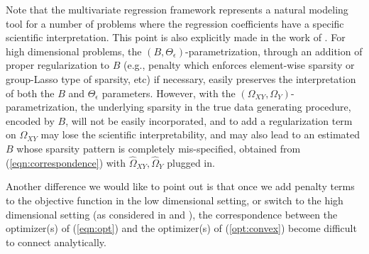 Note that the multivariate regression framework represents a natural modeling tool for a number of problems where the regression coefficients have a specific scientific interpretation. This point is also explicitly made in the work of \citet{andersson2001alternative}.  For high dimensional problems, the $(B,\Theta_\epsilon)$-parametrization, through an addition of  
proper regularization to $B$ (e.g., penalty which enforces element-wise sparsity or group-Lasso type of sparsity, etc) if necessary,
easily preserves the interpretation of both the $B$ and $\Theta_\epsilon$ parameters.
However, with the $(\Omega_{XY},\Omega_Y)$-parametrization, the underlying sparsity in the true data generating procedure, encoded by $B$, will not be easily incorporated, and to add a regularization term on $\Omega_{XY}$ may lose the scientific interpretability, and may also lead to an estimated $B$ whose sparsity pattern is completely mis-specified, obtained from (\ref{eqn:correspondence}) with $\widehat{\Omega}_{XY},\widehat{\Omega}_Y$ plugged in.

Another difference we would like to point out is that once we add penalty terms to the objective function in the low dimensional setting, or switch to the high dimensional setting (as considered in \citet{sohn2012joint} and \citet{yuan2014partial}), the correspondence between the optimizer(s) of (\ref{eqn:opt}) and the optimizer(s) of (\ref{opt:convex}) become difficult to connect analytically. 
